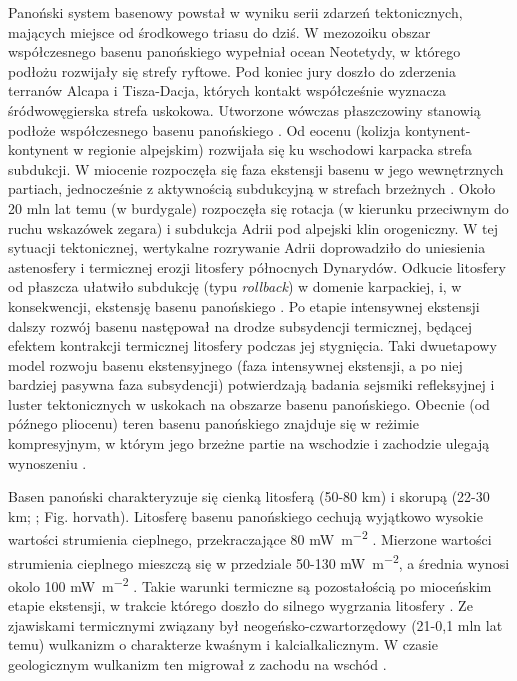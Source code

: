 \documentclass[11.5pt,twoside]{report}
\begin{document}
Panoński system basenowy powstał w wyniku serii zdarzeń tektonicznych, mających miejsce od środkowego triasu do dziś. W mezozoiku obszar współczesnego basenu panońskiego wypełniał ocean Neotetydy, w którego podłożu rozwijały się strefy ryftowe. Pod koniec jury doszło do zderzenia terranów Alcapa i Tisza-Dacja, których kontakt współcześnie wyznacza śródwowęgierska strefa uskokowa. Utworzone wówczas płaszczowiny stanowią podłoże współczesnego basenu panońskiego \parencite{Csontos.2004}. Od eocenu (kolizja kontynent-kontynent w regionie alpejskim) rozwijała się ku wschodowi karpacka strefa subdukcji. W miocenie rozpoczęła się faza ekstensji basenu w jego wewnętrznych partiach, jednocześnie z aktywnością subdukcyjną w strefach brzeżnych \parencite{Csontos.2004}. Około 20 mln lat temu (w burdygale) rozpoczęła się rotacja (w kierunku przeciwnym do ruchu wskazówek zegara) i subdukcja Adrii pod alpejski klin orogeniczny. W tej sytuacji tektonicznej, wertykalne rozrywanie Adrii doprowadziło do uniesienia astenosfery i termicznej erozji litosfery północnych Dynarydów. Odkucie litosfery od płaszcza ułatwiło subdukcję (typu \textit{rollback}) w domenie karpackiej, i, w konsekwencji, ekstensję basenu panońskiego \parencite{Handy.2012}. Po etapie intensywnej ekstensji dalszy rozwój basenu następował na drodze subsydencji termicznej, będącej efektem kontrakcji termicznej litosfery podczas jej stygnięcia. Taki dwuetapowy model rozwoju basenu ekstensyjnego (faza intensywnej ekstensji, a po niej bardziej pasywna faza subsydencji) potwierdzają badania sejsmiki refleksyjnej i luster tektonicznych w uskokach na obszarze basenu panońskiego. Obecnie (od pó\'{z}nego pliocenu) teren basenu panońskiego znajduje się w reżimie kompresyjnym, w którym jego brzeżne partie na wschodzie i zachodzie ulegają wynoszeniu \parencite{Horvath.1996}. 


Basen panoński charakteryzuje się cienką litosferą (50-80 km) i skorupą (22-30 km; \cite{Harangi.2007}; Fig. {horvath}). Litosferę basenu panońskiego cechują wyjątkowo wysokie wartości strumienia cieplnego, przekraczające 80 \si{\milli\watt\per\meter\squared} \parencite{Boldizsar.1964}. Mierzone wartości strumienia cieplnego mieszczą się w przedziale 50-130 \si{\milli\watt\per\meter\squared}, a średnia wynosi okolo 100 \si{\milli\watt\per\meter\squared} \parencite{Horvath.2015}. Takie warunki termiczne są pozostałością po mioceńskim etapie ekstensji, w trakcie którego doszło do silnego wygrzania litosfery \parencite{Lenkey.2017}. Ze zjawiskami termicznymi związany był neogeńsko-czwartorzędowy (21-0,1 mln lat temu) wulkanizm o charakterze kwaśnym i kalcialkalicznym. W czasie geologicznym wulkanizm ten migrował z zachodu na wschód \parencite{Lexa.2010}. 
\end{document}
